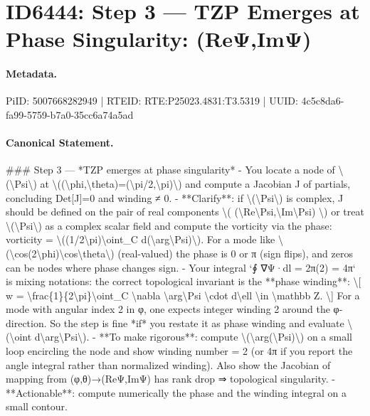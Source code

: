 \section*{ID6444: Step 3 — TZP Emerges at Phase Singularity: (ReΨ,ImΨ)}
\paragraph{Metadata.}
PiID: 5007668282949 | RTEID: RTE:P25023.4831:T3.5319 | UUID: 4c5c8da6-fa99-5759-b7a0-35cc6a74a5ad

\paragraph{Canonical Statement.}
\#\#\# Step 3 — *TZP emerges at phase singularity* - You locate a node of \textbackslash{}(\textbackslash{}Psi\textbackslash{}) at \textbackslash{}((\textbackslash{}phi,\textbackslash{}theta)=(\textbackslash{}pi/2,\textbackslash{}pi)\textbackslash{}) and compute a Jacobian J of partials, concluding Det[J]=0 and winding ≠ 0. - **Clarify**: if \textbackslash{}(\textbackslash{}Psi\textbackslash{}) is complex, J should be defined on the pair of real components \textbackslash{}( (\textbackslash{}Re\textbackslash{}Psi,\textbackslash{}Im\textbackslash{}Psi) \textbackslash{}) or treat \textbackslash{}(\textbackslash{}Psi\textbackslash{}) as a complex scalar field and compute the vorticity via the phase: vorticity = \textbackslash{}((1/2\textbackslash{}pi)\textbackslash{}oint\_C d(\textbackslash{}arg\textbackslash{}Psi)\textbackslash{}). For a mode like \textbackslash{}(\textbackslash{}cos(2\textbackslash{}phi)\textbackslash{}cos\textbackslash{}theta\textbackslash{}) (real-valued) the phase is 0 or π (sign flips), and zeros can be nodes where phase changes sign. - Your integral `∮ ∇Ψ·dl = 2π(2) = 4π` is mixing notations: the correct topological invariant is the **phase winding**: \textbackslash{}[ w = \textbackslash{}frac\{1\}\{2\textbackslash{}pi\}\textbackslash{}oint\_C \textbackslash{}nabla \textbackslash{}arg\textbackslash{}Psi \textbackslash{}cdot d\textbackslash{}ell \textbackslash{}in \textbackslash{}mathbb Z. \textbackslash{}] For a mode with angular index 2 in φ, one expects integer winding 2 around the φ-direction. So the step is fine *if* you restate it as phase winding and evaluate \textbackslash{}(\textbackslash{}oint d\textbackslash{}arg\textbackslash{}Psi\textbackslash{}). - **To make rigorous**: compute \textbackslash{}(\textbackslash{}arg(\textbackslash{}Psi)\textbackslash{}) on a small loop encircling the node and show winding number = 2 (or 4π if you report the angle integral rather than normalized winding). Also show the Jacobian of mapping from (φ,θ)→(ReΨ,ImΨ) has rank drop ⇒ topological singularity. - **Actionable**: compute numerically the phase and the winding integral on a small contour.

